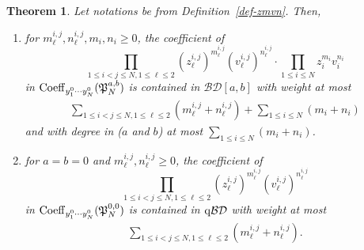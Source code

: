 \documentclass[12pt, reqno]{amsart}
\newtheorem{theorem}{Theorem}[section]
\theoremstyle{definition}
\theoremstyle{remark}
\numberwithin{equation}{section}
\newcommand{\BD}{\mathcal {BD}}
\newcommand{\Coe}{ {\rm Coeff} }
\newcommand{\qBD}{{\rm q}{\mathcal {BD}}}
\numberwithin{equation}{section}
\begin{document}
\begin{theorem}  \label{yij1toNm>0} 
Let notations be from Definition~\ref{def-zmvn}. Then,
\begin{enumerate}
\item[{\rm (i)}]
for $m_\ell^{i,j}, n_\ell^{i,j}, m_i, n_i \ge 0$, the coefficient of 
$$
\prod_{1 \le i < j \le N, 1 \le \ell \le 2} (z_\ell^{i,j})^{m_\ell^{i,j}}
(v_\ell^{i,j})^{n_\ell^{i,j}} \cdot \prod_{1 \le i \le N} 
z_i^{m_i} v_i^{n_i}
$$ 
in 
$
\Coe_{y_1^0 \cdots y_N^0}(\mathfrak P_{N}^{a,b})
$ 
is contained in $\BD[a, b]$ with weight at most 
\begin{eqnarray}    \label{yij1toNm>0.01}
\sum_{1 \le i < j \le N, 1 \le \ell \le 2} (m_\ell^{i,j} + n_\ell^{i,j})
+ \sum_{1 \le i \le N} (m_i + n_i)
\end{eqnarray}
and with degree in ($a$ and $b$) at most 
$
    \sum_{1 \le i \le N} (m_i + n_i)
$.

\item[{\rm (ii)}] 
for $a=b=0$ and $m_\ell^{i,j}, n_\ell^{i,j}\ge 0$, the coefficient of 
$$
\prod_{1 \le i < j \le N, 1 \le \ell \le 2} (z_\ell^{i,j})^{m_\ell^{i,j}}
(v_\ell^{i,j})^{n_\ell^{i,j}}
$$ 
in 
$
\Coe_{y_1^0 \cdots y_N^0}(\mathfrak P_{N}^{0,0})
$ 
is contained in $\qBD$ with weight at most 
\begin{eqnarray}    \label{yij1toNm>0.03}
\sum_{1 \le i < j \le N, 1 \le \ell \le 2} (m_\ell^{i,j} + n_\ell^{i,j}).
\end{eqnarray}
\end{enumerate}
\end{theorem}
\end{document}
